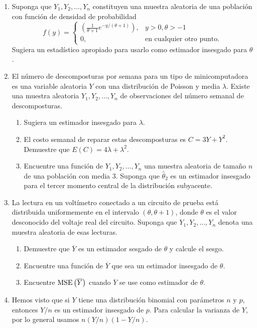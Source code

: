 \documentclass[a4paper]{scrreprt}
\begin{document}
\begin{enumerate}
\item Suponga que $Y_{1},Y_{2},\ldots,Y_{n}$ constituyen una muestra aleatoria de una población con función de densidad de probabilidad \[ f\left(y\right)=\begin{cases}\left(\frac{1}{\theta+1}e^{-y/\left(\theta+1\right)}\right),& y>0,\theta>-1\,\\0,&\text{en cualquier otro punto}.\end{cases} \] Sugiera un estadístico apropiado para usarlo como estimador insesgado para $\theta$.
\item El número de descomposturas por semana para un tipo de minicomputadora es una variable aleatoria $Y$ con una distribución de Poisson y media $\lambda$. Existe una muestra aleatoria $Y_{1},Y_{2},\ldots,Y_{n}$ de observaciones del número semanal de descomposturas.
\begin{enumerate}
	\item Sugiera un estimador insesgado para $\lambda$.
	\item El costo semanal de reparar estas descomposturas es $C=3Y+Y^{2}$. Demuestre que $E\left(C\right)=4\lambda+\lambda^{2}$.
	\item Encuentre una función de $Y_{1},Y_{2},\ldots, Y_{n}$ una muestra aleatoria de tamaño $n$ de una población con media $3$. Suponga que $\hat{\theta}_{2}$ es un estimador insesgado para el tercer momento central de la distribución subyacente.
\end{enumerate}
\item La lectura en un voltímetro conectado a un circuito de prueba está distribuida uniformemente en el intervalo $\left(\theta,\theta+1\right)$, donde $\theta$ es el valor desconocido del voltaje real del circuito. Suponga que $Y_{1},Y_{2},\ldots,Y_{n}$ denota una muestra aleatoria de esas lecturas.
\begin{enumerate}
	\item Demuestre que $\overline{Y}$ es un estimador sesgado de $\theta$ y calcule el sesgo.
	\item Encuentre una función de $\overline{Y}$ que sea un estimador insesgado de $\theta$.
	\item Encuentre $\operatornamewithlimits{MSE}\left(\overline{Y}\right)$ cuando $\overline{Y}$ se use como estimador de $\theta$.
\end{enumerate}
\item Hemos visto que si $Y$ tiene una distribución binomial con parámetros $n$ y $p$, entonces $Y/n$ es un estimador insesgado de $p$. Para calcular la varianza de $Y$, por lo general usamos $n\left(Y/n\right)\left(1-Y/n\right)$.

\end{enumerate}
\end{document}
